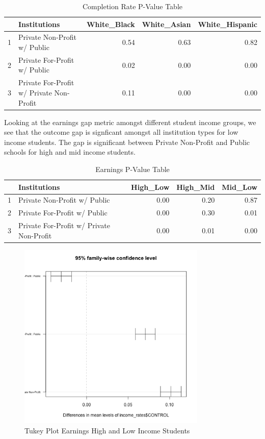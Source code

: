 \documentclass{article}
\begin{document}
\begin{table}[ht]
\centering
\begin{tabular}{rlrrr}
  \hline
 & Institutions & White\_Black & White\_Asian & White\_Hispanic \\ 
  \hline
1 & Private Non-Profit w/ Public & 0.54 & 0.63 & 0.82 \\ 
  2 & Private For-Profit w/ Public & 0.02 & 0.00 & 0.00 \\ 
  3 & Private For-Profit w/ Private Non-Profit & 0.11 & 0.00 & 0.00 \\ 
   \hline
\end{tabular}
\caption{Completion Rate P-Value Table} 
\end{table}
Looking at the earnings gap metric amongst different student income groups, we see that the outcome gap is signficant amongst all institution types for low income students. The gap is significant between Private Non-Profit and Public schools for high and mid income students.

\begin{table}[ht]
\centering
\begin{tabular}{rlrrr}
  \hline
 & Institutions & High\_Low & High\_Mid & Mid\_Low \\ 
  \hline
1 & Private Non-Profit w/ Public & 0.00 & 0.20 & 0.87 \\ 
  2 & Private For-Profit w/ Public & 0.00 & 0.30 & 0.01 \\ 
  3 & Private For-Profit w/ Private Non-Profit & 0.00 & 0.01 & 0.00 \\ 
   \hline
\end{tabular}
\caption{Earnings P-Value Table} 
\end{table}

\begin{figure}
\centering
\includegraphics[width=0.8\textwidth]{../images/earnings_tukeyplot_high_low.png}
\caption{\label{fig:TukeyPlot2}Tukey Plot Earnings High and Low Income Students}
\end{figure}
\end{document}
